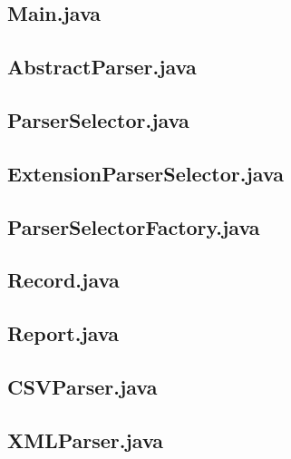 \documentclass[12pt]{extarticle}
\renewcommand{\baselinestretch}{1.5}
\begin{document}
\subsection*{Main.java}


\subsection*{AbstractParser.java}


\subsection*{ParserSelector.java}


\subsection*{ExtensionParserSelector.java}


\subsection*{ParserSelectorFactory.java}


\subsection*{Record.java}


\subsection*{Report.java}


\subsection*{CSVParser.java}


\subsection*{XMLParser.java}

\renewcommand{\baselinestretch}{1.5}
\end{document}
